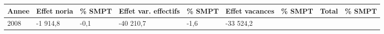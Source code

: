 \begin{longtable}[]{@{}lllllllll@{}}
\toprule
\begin{minipage}[b]{0.05\columnwidth}\raggedright
Annee\strut
\end{minipage} & \begin{minipage}[b]{0.10\columnwidth}\raggedright
Effet noria\strut
\end{minipage} & \begin{minipage}[b]{0.06\columnwidth}\raggedright
\% SMPT\strut
\end{minipage} & \begin{minipage}[b]{0.16\columnwidth}\raggedright
Effet var. effectifs\strut
\end{minipage} & \begin{minipage}[b]{0.06\columnwidth}\raggedright
\% SMPT\strut
\end{minipage} & \begin{minipage}[b]{0.12\columnwidth}\raggedright
Effet vacances\strut
\end{minipage} & \begin{minipage}[b]{0.06\columnwidth}\raggedright
\% SMPT\strut
\end{minipage} & \begin{minipage}[b]{0.09\columnwidth}\raggedright
Total\strut
\end{minipage} & \begin{minipage}[b]{0.06\columnwidth}\raggedright
\% SMPT\strut
\end{minipage}\tabularnewline
\midrule
\endhead
\begin{minipage}[t]{0.05\columnwidth}\raggedright
2008\strut
\end{minipage} & \begin{minipage}[t]{0.10\columnwidth}\raggedright
-1 914,8\strut
\end{minipage} & \begin{minipage}[t]{0.06\columnwidth}\raggedright
-0,1\strut
\end{minipage} & \begin{minipage}[t]{0.16\columnwidth}\raggedright
-40 210,7\strut
\end{minipage} & \begin{minipage}[t]{0.06\columnwidth}\raggedright
-1,6\strut
\end{minipage} & \begin{minipage}[t]{0.12\columnwidth}\raggedright
-33 524,2\strut
\end{minipage} & \begin{minipage}[t]{0.06\columnwidth}\raggedright

\end{minipage}
\end{longtable}
